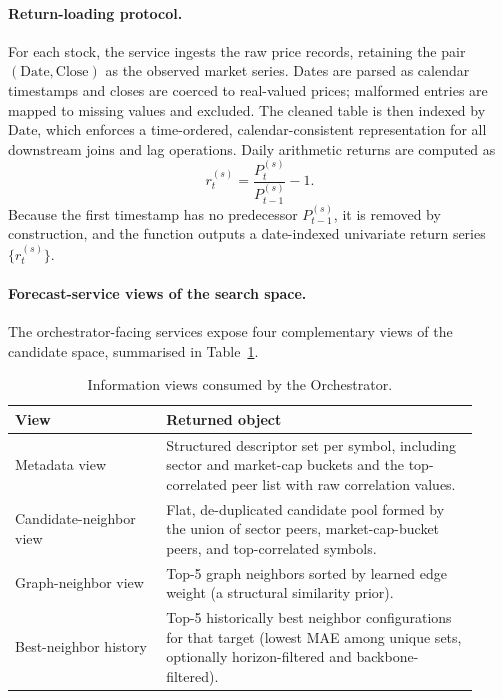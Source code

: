 \documentclass[12pt,a4paper,titlepage]{article}
\begin{document}
\paragraph{Return-loading protocol.}
For each stock, the service ingests the raw price records, retaining the pair \((\text{Date},\text{Close})\) as the observed market series. Dates are parsed as calendar timestamps and closes are coerced to real-valued prices; malformed entries are mapped to missing values and excluded. The cleaned table is then indexed by \(\text{Date}\), which enforces a time-ordered, calendar-consistent representation for all downstream joins and lag operations. Daily arithmetic returns are computed as
\[
r_t^{(s)} = \frac{P_t^{(s)}}{P_{t-1}^{(s)}} - 1.
\]
Because the first timestamp has no predecessor \(P_{t-1}^{(s)}\), it is removed by construction, and the function outputs a date-indexed univariate return series \(\{r_t^{(s)}\}\).

\paragraph{Forecast-service views of the search space.}
The orchestrator-facing services expose four complementary views of the candidate space, summarised in Table~\ref{tab:forecast-endpoints}.

\begin{table}[htbp]
\centering
\small
\caption{Information views consumed by the Orchestrator.}
\label{tab:forecast-endpoints}
\begin{tabular}{p{0.30\linewidth} p{0.62\linewidth}}
\toprule
View & Returned object \\
\midrule
Metadata view & Structured descriptor set per symbol, including sector and market-cap buckets and the top-correlated peer list with raw correlation values. \\
Candidate-neighbor view & Flat, de-duplicated candidate pool formed by the union of sector peers, market-cap-bucket peers, and top-correlated symbols. \\
Graph-neighbor view & Top-5 graph neighbors sorted by learned edge weight (a structural similarity prior). \\
Best-neighbor history & Top-5 historically best neighbor configurations for that target (lowest MAE among unique sets, optionally horizon-filtered and backbone-filtered). \\
\bottomrule
\end{tabular}
\end{table}
\end{document}

